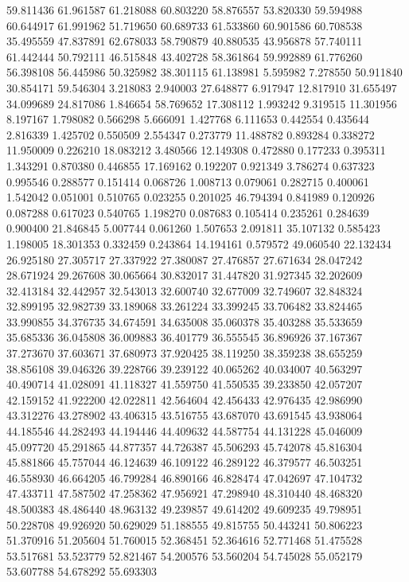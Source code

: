 59.811436
61.961587
61.218088
60.803220
58.876557
53.820330
59.594988
60.644917
61.991962
51.719650
60.689733
61.533860
60.901586
60.708538
35.495559
47.837891
62.678033
58.790879
40.880535
43.956878
57.740111
61.442444
50.792111
46.515848
43.402728
58.361864
59.992889
61.776260
56.398108
56.445986
50.325982
38.301115
61.138981
5.595982
7.278550
50.911840
30.854171
59.546304
3.218083
2.940003
27.648877
6.917947
12.817910
31.655497
34.099689
24.817086
1.846654
58.769652
17.308112
1.993242
9.319515
11.301956
8.197167
1.798082
0.566298
5.666091
1.427768
6.111653
0.442554
0.435644
2.816339
1.425702
0.550509
2.554347
0.273779
11.488782
0.893284
0.338272
11.950009
0.226210
18.083212
3.480566
12.149308
0.472880
0.177233
0.395311
1.343291
0.870380
0.446855
17.169162
0.192207
0.921349
3.786274
0.637323
0.995546
0.288577
0.151414
0.068726
1.008713
0.079061
0.282715
0.400061
1.542042
0.051001
0.510765
0.023255
0.201025
46.794394
0.841989
0.120926
0.087288
0.617023
0.540765
1.198270
0.087683
0.105414
0.235261
0.284639
0.900400
21.846845
5.007744
0.061260
1.507653
2.091811
35.107132
0.585423
1.198005
18.301353
0.332459
0.243864
14.194161
0.579572
49.060540
22.132434
26.925180
27.305717
27.337922
27.380087
27.476857
27.671634
28.047242
28.671924
29.267608
30.065664
30.832017
31.447820
31.927345
32.202609
32.413184
32.442957
32.543013
32.600740
32.677009
32.749607
32.848324
32.899195
32.982739
33.189068
33.261224
33.399245
33.706482
33.824465
33.990855
34.376735
34.674591
34.635008
35.060378
35.403288
35.533659
35.685336
36.045808
36.009883
36.401779
36.555545
36.896926
37.167367
37.273670
37.603671
37.680973
37.920425
38.119250
38.359238
38.655259
38.856108
39.046326
39.228766
39.239122
40.065262
40.034007
40.563297
40.490714
41.028091
41.118327
41.559750
41.550535
39.233850
42.057207
42.159152
41.922200
42.022811
42.564604
42.456433
42.976435
42.986990
43.312276
43.278902
43.406315
43.516755
43.687070
43.691545
43.938064
44.185546
44.282493
44.194446
44.409632
44.587754
44.131228
45.046009
45.097720
45.291865
44.877357
44.726387
45.506293
45.742078
45.816304
45.881866
45.757044
46.124639
46.109122
46.289122
46.379577
46.503251
46.558930
46.664205
46.799284
46.890166
46.828474
47.042697
47.104732
47.433711
47.587502
47.258362
47.956921
47.298940
48.310440
48.468320
48.500383
48.486440
48.963132
49.239857
49.614202
49.609235
49.798951
50.228708
49.926920
50.629029
51.188555
49.815755
50.443241
50.806223
51.370916
51.205604
51.760015
52.368451
52.364616
52.771468
51.475528
53.517681
53.523779
52.821467
54.200576
53.560204
54.745028
55.052179
53.607788
54.678292
55.693303

